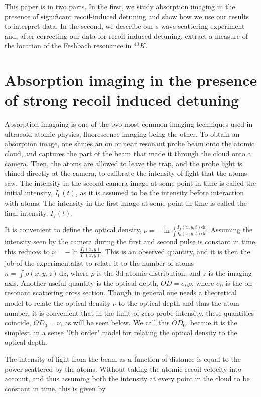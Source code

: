 \documentclass[12pt]{iopart}
\begin{document}
\par This paper is in two parts. In the first, we study absorption imaging in the presence of significant recoil-induced detuning and show how we use our results to interpret data. In the second, we describe our s-wave scattering experiment and, after correcting our data for recoil-induced detuning, extract a measure of the location of the Feshbach resonance in $^{40}K$. 

\section{Absorption imaging in the presence of strong recoil induced detuning}
Absorption imagaing is one of the two most common imaging techniques used in ultracold atomic physics, fluorescence imaging being the other. To obtain an absorption image, one shines an on or near resonant probe beam onto the atomic cloud, and captures the part of the beam that made it through the cloud onto a camera. Then, the atoms are allowed to leave the trap, and the probe light is shined directly at the camera, to calibrate the intensity of light that the atoms saw. The intensity in the second camera image at some point in time is called the initial intensity, $I_{0}(t)$, as it is assumed to be the intensity before interaction with atoms. The intensity in the first image at some point in time is called the final intensity, $I_f(t)$.  
\par It is convenient to define the optical density, $\nu=-\ln{\frac{\int{I_f(x,y,t)}\mathrm{d}t}{\int{I_0(x,y,t)}\mathrm{d}t}}$. Assuming the intensity seen by the camera during the first and second pulse is constant in time, this reduces to $\nu=-\ln{\frac{I_f(x,y)}{I_0(x,y)}}$. This is an observed quantity, and it is then the job of the experimentalist to relate it to the number of atoms $n = \int \rho\left(x,y,z\right) \,\mathrm{d}z$, where $\rho$ is the 3d atomic distribution, and $z$ is the imaging axis. Another useful quantity is the optical depth, $OD=\sigma_0\rho$, where $\sigma_0$ is the on-resonant scattering cross section. Though in general one needs a theoretical model to relate the optical density $\nu$ to the optical depth  and thus the atom number, it is convenient that in the limit of zero probe intensity, these quantities coincide, $OD_0=\nu$, as will be seen below. We call this $OD_0$, becaue it is the simplest, in a sense "0th order" model for relating the optical density to the optical depth.
\par The intensity of light from the beam as a function of distance is equal to the power scattered by the atoms. Without taking the atomic recoil velocity into account, and thus assuming both the intensity at every point in the cloud to be constant in time, this is given by \cite{Reinaudi07}
\end{document}
